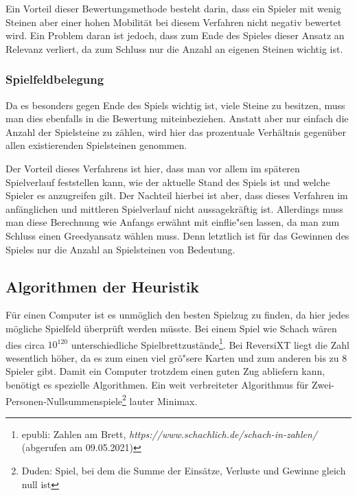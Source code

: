 Ein Vorteil dieser Bewertungsmethode besteht darin, dass ein Spieler mit wenig Steinen aber einer hohen Mobilit\"at bei diesem Verfahren nicht negativ bewertet wird.
Ein Problem daran ist jedoch, dass zum Ende des Spieles dieser Ansatz an Relevanz verliert, da zum Schluss nur die Anzahl an eigenen Steinen wichtig ist.

\subsubsection{Spielfeldbelegung}\label{subsubsec:spielfeldbelegung}
Da es besonders gegen Ende des Spiels wichtig ist, viele Steine zu besitzen, muss man dies ebenfalls in die Bewertung miteinbeziehen.
Anstatt aber nur einfach die Anzahl der Spielsteine zu z\"ahlen, wird hier das prozentuale Verh\"altnis gegen\"uber allen existierenden Spielsteinen genommen.

Der Vorteil dieses Verfahrens ist hier, dass man vor allem im sp\"ateren Spielverlauf feststellen kann, wie der aktuelle Stand des Spiels ist und welche Spieler es anzugreifen gilt.
Der Nachteil hierbei ist aber, dass dieses Verfahren im anf\"anglichen und mittleren Spielverlauf nicht aussagekr\"aftig ist.
Allerdings muss man diese Berechnung wie Anfangs erw\"ahnt mit einflie"sen lassen, da man zum Schluss einen Greedyansatz w\"ahlen muss.
Denn letztlich ist f\"ur das Gewinnen des Spieles nur die Anzahl an Spielsteinen von Bedeutung.


\subsection{Algorithmen der Heuristik}\label{subsec:algorithmen-der-heuristik}
F\"ur einen Computer ist es unm\"oglich den besten Spielzug zu finden, da hier jedes m\"ogliche Spielfeld \"uberpr\"uft werden m\"usste.
Bei einem Spiel wie Schach w\"aren dies circa $10^{120}$ unterschiedliche Spielbrettzust\"ande\footnote{epubli: Zahlen am Brett, \textit{https://www.schachlich.de/schach-in-zahlen/} (abgerufen am 09.05.2021)}.
Bei ReversiXT liegt die Zahl wesentlich h\"oher, da es zum einen viel gr\"o"sere Karten und zum anderen bis zu 8 Spieler gibt.
Damit ein Computer trotzdem einen guten Zug abliefern kann, ben\"otigt es spezielle Algorithmen.
Ein weit verbreiteter Algorithmus f\"ur Zwei-Personen-Nullsummenspiele\footnote{Duden: Spiel, bei dem die Summe der Einsätze, Verluste und Gewinne gleich null ist} lauter Minimax.

